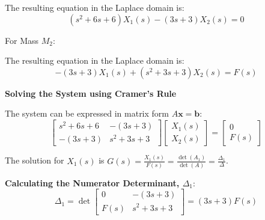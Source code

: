﻿\documentclass[11pt]{article}
\begin{document}
The resulting equation in the Laplace domain is:
\begin{equation}
(s^2 + 6s + 6)X_1(s) - (3s + 3)X_2(s) = 0 \tag{1}
\end{equation}

\vspace{12pt}
{For Mass $M_2$:}
\begin{figure}[h!]
\centering
{}
\end{figure}

The resulting equation in the Laplace domain is:
\begin{equation}
-(3s + 3)X_1(s) + (s^2 + 3s + 3)X_2(s) = F(s) \tag{2}
\end{equation}

\newpage
\noindent\textbf{Solving the System using Cramer's Rule}
\vspace{12pt}

The system can be expressed in matrix form $A\mathbf{x} = \mathbf{b}$:
$$
\begin{bmatrix}
s^2 + 6s + 6 & -(3s + 3) \\
-(3s + 3) & s^2 + 3s + 3
\end{bmatrix}
\begin{bmatrix}
X_1(s) \\
X_2(s)
\end{bmatrix}
=
\begin{bmatrix}
0 \\
F(s)
\end{bmatrix}
$$

The solution for $X_1(s)$ is $G(s) = \frac{X_1(s)}{F(s)} = \frac{\det(A_1)}{\det(A)} = \frac{\Delta_1}{\Delta}$.

\vspace{12pt}
\noindent\textbf{Calculating the Numerator Determinant, $\Delta_1$}:
$$ \Delta_1 = \det
\begin{bmatrix}
0 & -(3s + 3) \\
F(s) & s^2 + 3s + 3
\end{bmatrix}
= (3s + 3)F(s) $$
\end{document}

